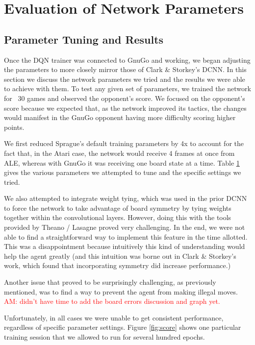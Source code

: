 \section{Evaluation of Network Parameters}

\subsection*{Parameter Tuning and Results}

Once the DQN trainer was connected to GnuGo and working, we began adjusting the parameters to more closely mirror those of Clark \& Storkey's DCNN. In this section we discuss the network parameters we tried and the results we were able to achieve with them. To test any given set of parameters, we trained the network for ~30 games and observed the opponent's score. We focused on the opponent's score because we expected that, as the network improved its tactics, the changes would manifest in the GnuGo opponent having more difficulty scoring higher points.

We first reduced Sprague's default training parameters by 4x to account for the fact that, in the Atari case, the network would receive 4 frames at once from ALE, whereas with GnuGo it was receiving one board state at a time. Table \ref{} gives the various parameters we attempted to tune and the specific settings we tried.

We also attempted to integrate weight tying, which was used in the prior DCNN to force the network to take advantage of board symmetry by tying weights together within the convolutional layers. However, doing this with the tools provided by Theano / Lasagne proved very challenging. In the end, we were not able to find a straightforward way to implement this feature in the time allotted. This was a disappointment because intuitively this kind of understanding would help the agent greatly (and this intuition was borne out in Clark \& Storkey's work, which found that incorporating symmetry did increase performance.)

Another issue that proved to be surprisingly challenging, as previously mentioned, was to find a way to prevent the agent from making illegal moves. \textcolor{red}{AM: didn't have time to add the board errors discussion and graph yet.}

Unfortunately, in all cases we were unable to get consistent performance, regardless of specific parameter settings. Figure \ref{fig:score} shows one particular training session that we allowed to run for several hundred epochs. 


